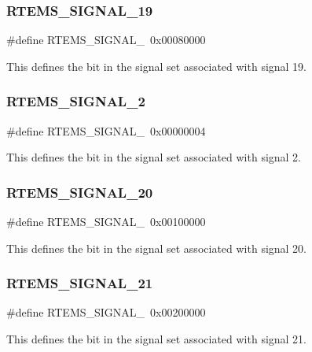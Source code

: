 \subsubsection{\texorpdfstring{RTEMS\_SIGNAL\_19}{RTEMS\_SIGNAL\_19}}
{\footnotesize\ttfamily \#define R\+T\+E\+M\+S\+\_\+\+S\+I\+G\+N\+A\+L\+\_~0x00080000}

This defines the bit in the signal set associated with signal 19. \mbox{\label{group__ClassicASR_ga0b46502e8c231be8e3761647f70686f2}} 
\subsubsection{\texorpdfstring{RTEMS\_SIGNAL\_2}{RTEMS\_SIGNAL\_2}}
{\footnotesize\ttfamily \#define R\+T\+E\+M\+S\+\_\+\+S\+I\+G\+N\+A\+L\+\_~0x00000004}

This defines the bit in the signal set associated with signal 2. \mbox{\label{group__ClassicASR_ga86e76ab69a836841690f6656a2001d09}} 
\subsubsection{\texorpdfstring{RTEMS\_SIGNAL\_20}{RTEMS\_SIGNAL\_20}}
{\footnotesize\ttfamily \#define R\+T\+E\+M\+S\+\_\+\+S\+I\+G\+N\+A\+L\+\_~0x00100000}

This defines the bit in the signal set associated with signal 20. \mbox{\label{group__ClassicASR_ga6d704faf35f8656484463d164db8dda9}} 
\subsubsection{\texorpdfstring{RTEMS\_SIGNAL\_21}{RTEMS\_SIGNAL\_21}}
{\footnotesize\ttfamily \#define R\+T\+E\+M\+S\+\_\+\+S\+I\+G\+N\+A\+L\+\_~0x00200000}

This defines the bit in the signal set associated with signal 21. \mbox{\label{group__ClassicASR_gac6dd588f82f3463c3555cd52aab5712b}} 
